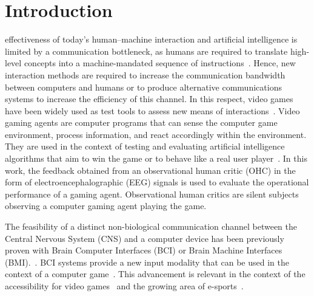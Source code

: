 \documentclass[journal]{IEEEtran}
\begin{document}
%
\IEEEpeerreviewmaketitle



\section{Introduction}



 effectiveness of today's human–machine interaction and artificial intelligence is limited by a communication bottleneck, as humans are required to translate high-level concepts into a machine-mandated sequence of instructions~\cite{Xu2020,CURSOR-CONTROL-PAPER}.   Hence, new interaction methods are required to increase the communication bandwidth between computers and humans or to produce alternative communications systems to increase the efficiency of this channel.  In this respect, video games have been widely used as test tools to assess new means of interactions~\cite{Carter2014,Barr2007}. Video gaming agents are computer programs that can sense the computer game environment, process information, and react accordingly within the environment.  They are used in the context of testing and evaluating artificial intelligence algorithms that aim to win the game or to behave like a real user player~\cite{Zhao2020}.
In this work, the feedback obtained from an observational human critic (OHC) in the form of electroencephalographic (EEG) signals is used to evaluate the operational performance of a gaming agent.  Observational human critics are silent subjects observing a computer gaming agent playing the game.

The feasibility of a distinct non-biological communication channel between the Central Nervous System (CNS) and a computer device has been previously proven with Brain Computer Interfaces (BCI) or Brain Machine Interfaces (BMI).~\cite{Vasiljevic2020}.  BCI systems provide a new input modality that can be used in the context of a computer game~\cite{Scherer2012,Nijholt2007}. This advancement is relevant in the context of the accessibility for video games~\cite{Aguado-Delgado2020} and the growing area of e-sports~\cite{Yakovlev2020}.
\end{document}
